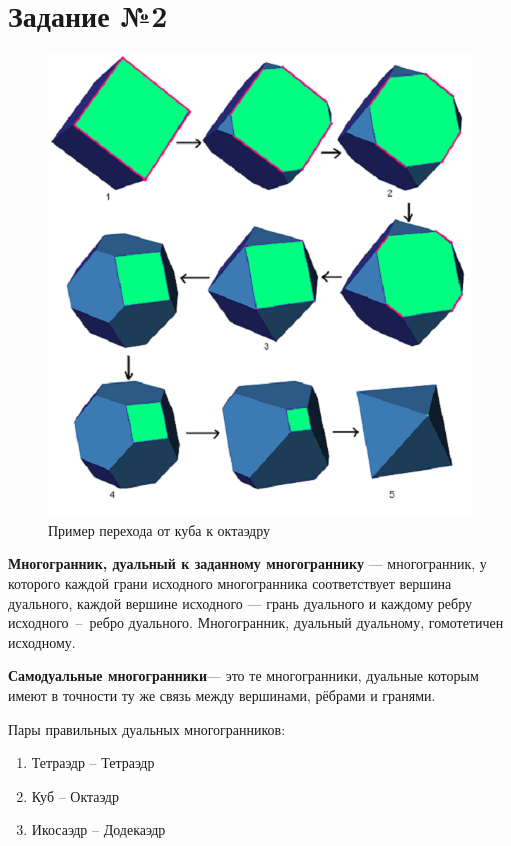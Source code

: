 \documentclass[12pt]{article}
\begin{document}
\section{Задание №2}
\begin{figure} 
	\includegraphics{1_2}
	\caption{Пример перехода от куба к октаэдру}
\end{figure}
\textbf{Многогранник, дуальный к заданному многограннику} — многогранник, у которого каждой грани исходного многогранника соответствует вершина дуального, каждой вершине исходного — грань дуального и каждому ребру исходного~--~ребро дуального. Многогранник, дуальный дуальному, гомотетичен исходному. 

\textbf{Самодуальные многогранники}— это те многогранники, дуальные которым имеют в точности ту же связь между вершинами, рёбрами и гранями.

Пары правильных дуальных многогранников:
\begin{enumerate}
	\item Тетраэдр -- Тетраэдр
	\item Куб -- Октаэдр
	\item Икосаэдр -- Додекаэдр
\end{enumerate}
\end{document}
